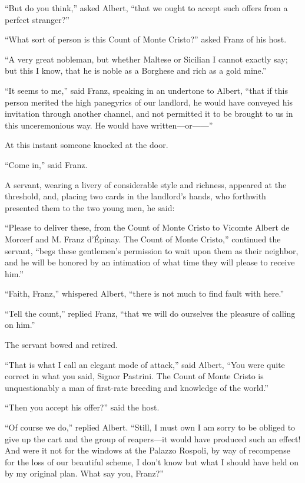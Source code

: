 “But do you think,” asked Albert, “that we ought to accept such offers
from a perfect stranger?”

“What sort of person is this Count of Monte Cristo?” asked Franz of his
host.

“A very great nobleman, but whether Maltese or Sicilian I cannot
exactly say; but this I know, that he is noble as a Borghese and rich
as a gold mine.”

“It seems to me,” said Franz, speaking in an undertone to Albert, “that
if this person merited the high panegyrics of our landlord, he would
have conveyed his invitation through another channel, and not permitted
it to be brought to us in this unceremonious way. He would have
written—or——”

At this instant someone knocked at the door.

“Come in,” said Franz.

A servant, wearing a livery of considerable style and richness,
appeared at the threshold, and, placing two cards in the landlord’s
hands, who forthwith presented them to the two young men, he said:

“Please to deliver these, from the Count of Monte Cristo to Vicomte
Albert de Morcerf and M. Franz d’Épinay. The Count of Monte Cristo,”
continued the servant, “begs these gentlemen’s permission to wait upon
them as their neighbor, and he will be honored by an intimation of what
time they will please to receive him.”

“Faith, Franz,” whispered Albert, “there is not much to find fault with
here.”

“Tell the count,” replied Franz, “that we will do ourselves the
pleasure of calling on him.”

The servant bowed and retired.

“That is what I call an elegant mode of attack,” said Albert, “You were
quite correct in what you said, Signor Pastrini. The Count of Monte
Cristo is unquestionably a man of first-rate breeding and knowledge of
the world.”

“Then you accept his offer?” said the host.

“Of course we do,” replied Albert. “Still, I must own I am sorry to be
obliged to give up the cart and the group of reapers—it would have
produced such an effect! And were it not for the windows at the Palazzo
Rospoli, by way of recompense for the loss of our beautiful scheme, I
don’t know but what I should have held on by my original plan. What say
you, Franz?”

